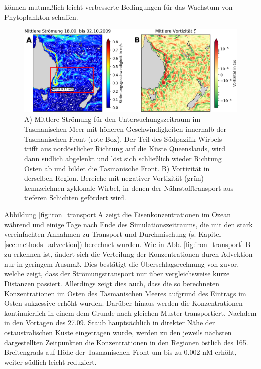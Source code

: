 \documentclass[12pt,a4paper,onecolumn]{scrartcl}
\begin{document}
können mutmaßlich leicht verbesserte Bedingungen für das Wachstum von Phytoplankton schaffen.
\begin{figure}[!htb]
\includegraphics[width=\textwidth]{bilder/currents_mean.png}
\caption{A) Mittlere Strömung für den Untersuchungszeitraum im Tasmanischen Meer mit höheren Geschwindigkeiten innerhalb der Tasmanischen Front (rote Box). Der Teil des Südpazifik-Wirbels trifft aus nordöstlicher Richtung auf die Küste Queenslands, wird dann südlich abgelenkt und löst sich schließlich wieder Richtung Osten ab und bildet die Tasmanische Front. B) Vortizität in derselben Region. Bereiche mit negativer Vortizität (grün) kennzeichnen zyklonale Wirbel, in denen der Nährstofftransport aus tieferen Schichten gefördert wird. } \label{fig:tasman_current}
\end{figure}
Abbildung \ref{fig:iron_transport}A zeigt die Eisenkonzentrationen im Ozean während und einige Tage nach Ende des Simulationszeitraums, die mit den stark vereinfachten Annahmen zu Transport und Durchmischung (s. Kapitel \ref{sec:methods_advection}) berechnet wurden. Wie in Abb. \ref{fig:iron_transport} B zu erkennen ist, ändert sich die Verteilung der Konzentrationen durch Advektion nur in geringem Ausmaß. Dies bestätigt die Überschlagsrechnung von zuvor, welche zeigt, dass der Strömungstransport nur über vergleichsweise kurze Distanzen passiert. Allerdings zeigt dies auch, dass die so berechneten Konzentrationen im Osten des Tasmanischen Meeres aufgrund des Eintrags im Osten sukzessive erhöht wurden. Darüber hinaus werden die Konzentrationen kontinuierlich in einem dem Grunde nach gleichen Muster transportiert. Nachdem in den Vortagen des 27.09. Staub hauptsächlich in direkter Nähe der ostaustralischen Küste eingetragen wurde, werden zu den jeweils nächsten dargestellten Zeitpunkten die Konzentrationen in den Regionen östlich des 165. Breitengrads auf Höhe der Tasmanischen Front um bis zu 0.002 nM erhöht, weiter südlich leicht reduziert.
\end{document}
